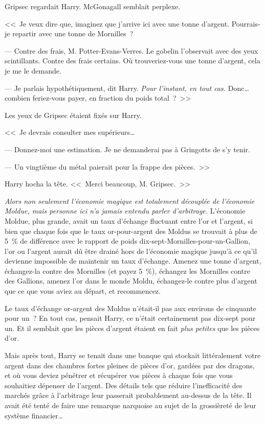 Gripsec regardait Harry. McGonagall semblait perplexe.

<<~Je veux dire que, imaginez que j'arrive ici avec une tonne d'argent. Pourrais-je repartir avec une tonne de Mornilles~?

--- Contre des frais, M. Potter-Evans-Verres. Le gobelin l'observait avec des yeux scintillants. Contre des frais certains. Où trouveriez-vous une tonne d'argent, cela je me le demande.

--- Je parlais hypothétiquement, dit Harry. \emph{Pour l'instant, en tout cas.} Donc… combien feriez-vous payer, en fraction du poids total~?~>>

Les yeux de Gripsec étaient fixés sur Harry.

<<~Je devrais consulter mes supérieurs…

--- Donnez-moi une estimation. Je ne demanderai pas à Gringotts de s'y tenir.

--- Un vingtième du métal paierait pour la frappe des pièces.~>>

Harry hocha la tête. <<~Merci beaucoup, M. Gripsec.~>>

\emph{Alors non seulement l'économie magique est totalement découplée de l'économie Moldue, mais personne ici n'a jamais entendu parler d'arbitrage.} L'économie Moldue, plus grande, avait un taux d'échange fluctuant entre l'or et l'argent, si bien que chaque fois que le taux or-pour-argent des Moldus se trouvait à plus de 5~\% de différence avec le rapport de poids dix-sept-Mornilles-pour-un-Gallion, l'or ou l'argent aurait dû être drainé hors de l'économie magique jusqu'à ce qu'il devienne impossible de maintenir un taux d'échange. Amenez une tonne d'argent, échangez-la contre des Mornilles (et payez 5~\%), échangez les Mornilles contre des Gallions, amenez l'or dans le monde Moldu, échangez-le contre plus d'argent que ce que vous aviez au départ, et recommencez.

Le taux d'échange or-argent des Moldus n'était-il pas aux environs de cinquante pour un~? En tout cas, pensait Harry, ce n'était certainement pas dix-sept pour un. Et il semblait que les pièces d'argent étaient en fait \emph{plus petites} que les pièces d'or.

Mais après tout, Harry se tenait dans une banque qui stockait littéralement votre argent dans des chambres fortes pleines de pièces d'or, gardées par des dragons, et où vous deviez pénétrer et récupérer vos pièces à chaque fois que vous souhaitiez dépenser de l'argent. Des détails tels que réduire l'inefficacité des marchés grâce à l'arbitrage leur passerait probablement au-dessus de la tête. Il avait été tenté de faire une remarque narquoise au sujet de la grossièreté de leur système financier…

